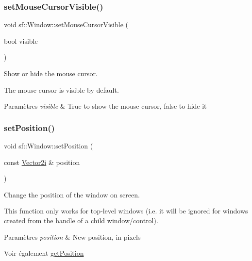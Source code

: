 \subsubsection{\texorpdfstring{set\+Mouse\+Cursor\+Visible()}{setMouseCursorVisible()}}
{\footnotesize\ttfamily void sf\+::\+Window\+::set\+Mouse\+Cursor\+Visible (\begin{DoxyParamCaption}\item[{bool}]{visible }\end{DoxyParamCaption})}



Show or hide the mouse cursor. 

The mouse cursor is visible by default.


\begin{DoxyParams}{Paramètres}
{\em visible} & True to show the mouse cursor, false to hide it \\
\hline
\end{DoxyParams}
\mbox{\label{classsf_1_1Window_a6c4078bfbf61c29bfc4b4732ce764f17}} 
\subsubsection{\texorpdfstring{set\+Position()}{setPosition()}}
{\footnotesize\ttfamily void sf\+::\+Window\+::set\+Position (\begin{DoxyParamCaption}\item[{const \hyperlink{classsf_1_1Vector2}{Vector2i} \&}]{position }\end{DoxyParamCaption})}



Change the position of the window on screen. 

This function only works for top-\/level windows (i.\+e. it will be ignored for windows created from the handle of a child window/control).


\begin{DoxyParams}{Paramètres}
{\em position} & New position, in pixels\\
\hline
\end{DoxyParams}
\begin{DoxySeeAlso}{Voir également}
\hyperlink{classsf_1_1Window_a420028b8e4d9baedcaaba7b2047b8cb3}{get\+Position} 
\end{DoxySeeAlso}
\mbox{\label{classsf_1_1Window_ab94ea32f22d15c0df11588e319de2546}} 
